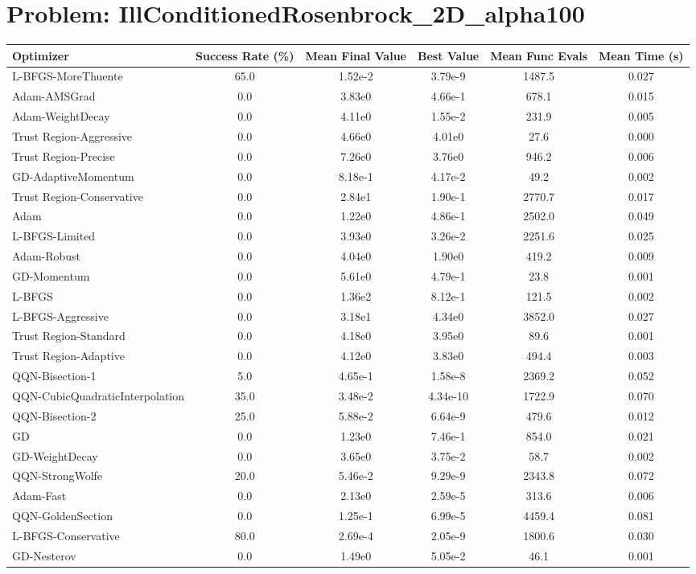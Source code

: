 \documentclass{article}
\begin{document}
\section{Problem: IllConditionedRosenbrock\_2D\_alpha100}
\begin{longtable}{p{3cm}*{5}{c}}
\toprule
\textbf{Optimizer} & \textbf{Success Rate (\%)} & \textbf{Mean Final Value} & \textbf{Best Value} & \textbf{Mean Func Evals} & \textbf{Mean Time (s)} \\
\midrule
L-BFGS-MoreThuente & 65.0 & 1.52e-2 & 3.79e-9 & 1487.5 & 0.027 \\
Adam-AMSGrad & 0.0 & 3.83e0 & 4.66e-1 & 678.1 & 0.015 \\
Adam-WeightDecay & 0.0 & 4.11e0 & 1.55e-2 & 231.9 & 0.005 \\
Trust Region-Aggressive & 0.0 & 4.66e0 & 4.01e0 & 27.6 & 0.000 \\
Trust Region-Precise & 0.0 & 7.26e0 & 3.76e0 & 946.2 & 0.006 \\
GD-AdaptiveMomentum & 0.0 & 8.18e-1 & 4.17e-2 & 49.2 & 0.002 \\
Trust Region-Conservative & 0.0 & 2.84e1 & 1.90e-1 & 2770.7 & 0.017 \\
Adam & 0.0 & 1.22e0 & 4.86e-1 & 2502.0 & 0.049 \\
L-BFGS-Limited & 0.0 & 3.93e0 & 3.26e-2 & 2251.6 & 0.025 \\
Adam-Robust & 0.0 & 4.04e0 & 1.90e0 & 419.2 & 0.009 \\
GD-Momentum & 0.0 & 5.61e0 & 4.79e-1 & 23.8 & 0.001 \\
L-BFGS & 0.0 & 1.36e2 & 8.12e-1 & 121.5 & 0.002 \\
L-BFGS-Aggressive & 0.0 & 3.18e1 & 4.34e0 & 3852.0 & 0.027 \\
Trust Region-Standard & 0.0 & 4.18e0 & 3.95e0 & 89.6 & 0.001 \\
Trust Region-Adaptive & 0.0 & 4.12e0 & 3.83e0 & 494.4 & 0.003 \\
QQN-Bisection-1 & 5.0 & 4.65e-1 & 1.58e-8 & 2369.2 & 0.052 \\
QQN-CubicQuadraticInterpolation & 35.0 & 3.48e-2 & 4.34e-10 & 1722.9 & 0.070 \\
QQN-Bisection-2 & 25.0 & 5.88e-2 & 6.64e-9 & 479.6 & 0.012 \\
GD & 0.0 & 1.23e0 & 7.46e-1 & 854.0 & 0.021 \\
GD-WeightDecay & 0.0 & 3.65e0 & 3.75e-2 & 58.7 & 0.002 \\
QQN-StrongWolfe & 20.0 & 5.46e-2 & 9.29e-9 & 2343.8 & 0.072 \\
Adam-Fast & 0.0 & 2.13e0 & 2.59e-5 & 313.6 & 0.006 \\
QQN-GoldenSection & 0.0 & 1.25e-1 & 6.99e-5 & 4459.4 & 0.081 \\
L-BFGS-Conservative & 80.0 & 2.69e-4 & 2.05e-9 & 1800.6 & 0.030 \\
GD-Nesterov & 0.0 & 1.49e0 & 5.05e-2 & 46.1 & 0.001 \\
\bottomrule
\end{longtable}
\end{document}
